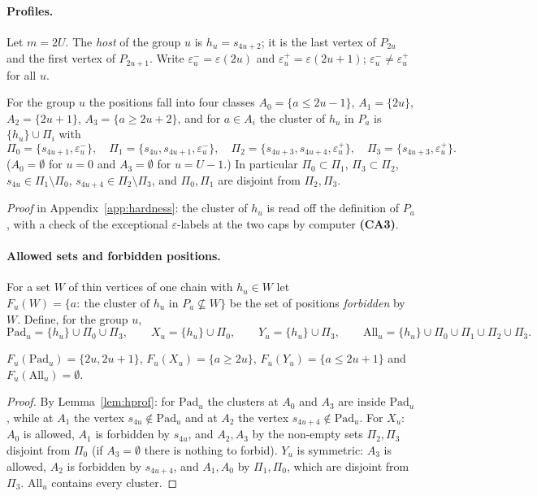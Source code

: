 \paragraph{Profiles.} Let $m=2U$. The \emph{host} of the group $u$ is $h_u=s_{4u+2}$; it is the last vertex of $P_{2u}$ and the first vertex of $P_{2u+1}$. Write $\varepsilon^-_u=\varepsilon(2u)$ and $\varepsilon^+_u=\varepsilon(2u+1)$; $\varepsilon^-_u\ne\varepsilon^+_u$ for all $u$.
\begin{lemma}\label{lem:hprof}
For the group $u$ the positions fall into four classes $A_0=\{a\le2u-1\}$, $A_1=\{2u\}$, $A_2=\{2u+1\}$, $A_3=\{a\ge 2u+2\}$, and for $a\in A_i$ the cluster of $h_u$ in $P_a$ is $\{h_u\}\cup\Pi_i$ with
\[
\Pi_0=\{s_{4u+1},\varepsilon^-_u\},\quad \Pi_1=\{s_{4u},s_{4u+1},\varepsilon^-_u\},\quad \Pi_2=\{s_{4u+3},s_{4u+4},\varepsilon^+_u\},\quad \Pi_3=\{s_{4u+3},\varepsilon^+_u\}.
\]
($A_0=\emptyset$ for $u=0$ and $A_3=\emptyset$ for $u=U-1$.) In particular $\Pi_0\subset\Pi_1$, $\Pi_3\subset\Pi_2$, $s_{4u}\in\Pi_1\setminus\Pi_0$, $s_{4u+4}\in\Pi_2\setminus\Pi_3$, and $\Pi_0,\Pi_1$ are disjoint from $\Pi_2,\Pi_3$.
\end{lemma}
\emph{Proof} in Appendix~\ref{app:hardness}: the cluster of $h_u$ is read off the definition of $P_a$, with a check of the exceptional $\varepsilon$-labels at the two caps by computer \textbf{(CA3)}.

\paragraph{Allowed sets and forbidden positions.} For a set $W$ of thin vertices of one chain with $h_u\in W$ let $F_u(W)=\{a:\ \text{the cluster of }h_u\text{ in }P_a\not\subseteq W\}$ be the set of positions \emph{forbidden} by $W$. Define, for the group $u$,
\[
\mathrm{Pad}_u=\{h_u\}\cup\Pi_0\cup\Pi_3,\qquad X_u=\{h_u\}\cup\Pi_0,\qquad Y_u=\{h_u\}\cup\Pi_3,\qquad \mathrm{All}_u=\{h_u\}\cup\Pi_0\cup\Pi_1\cup\Pi_2\cup\Pi_3 .
\]
\begin{corollary}\label{cor:hforb}
$F_u(\mathrm{Pad}_u)=\{2u,2u+1\}$, $F_u(X_u)=\{a\ge2u\}$, $F_u(Y_u)=\{a\le2u+1\}$ and $F_u(\mathrm{All}_u)=\emptyset$.
\end{corollary}
\begin{proof}
By Lemma~\ref{lem:hprof}: for $\mathrm{Pad}_u$ the clusters at $A_0$ and $A_3$ are inside $\mathrm{Pad}_u$, while at $A_1$ the vertex $s_{4u}\notin\mathrm{Pad}_u$ and at $A_2$ the vertex $s_{4u+4}\notin\mathrm{Pad}_u$. For $X_u$: $A_0$ is allowed, $A_1$ is forbidden by $s_{4u}$, and $A_2,A_3$ by the non-empty sets $\Pi_2,\Pi_3$ disjoint from $\Pi_0$ (if $A_3=\emptyset$ there is nothing to forbid). $Y_u$ is symmetric: $A_3$ is allowed, $A_2$ is forbidden by $s_{4u+4}$, and $A_1,A_0$ by $\Pi_1,\Pi_0$, which are disjoint from $\Pi_3$. $\mathrm{All}_u$ contains every cluster.
\end{proof}

